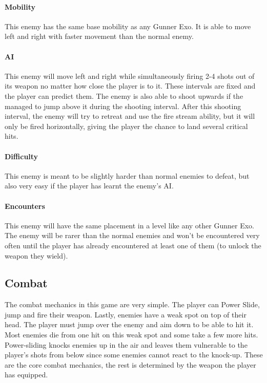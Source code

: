 \documentclass[12pt]{article}
\begin{document}
\paragraph{Mobility}

This enemy has the same base mobility as any Gunner Exo. It is able to move left and right with faster movement than the normal enemy.

\paragraph{AI}

This enemy will move left and right while simultaneously firing 2-4 shots out of its weapon no matter how close the player is to it. These intervals are fixed and the player can predict them. The enemy is also able to shoot upwards if the managed to jump above it during the shooting interval. After this shooting interval, the enemy will try to retreat and use the fire stream ability, but it will only be fired horizontally, giving the player the chance to land several critical hits. 

\paragraph{Difficulty}

This enemy is meant to be slightly harder than normal enemies to defeat, but also very easy if the player has learnt the enemy's AI. 

\paragraph{Encounters}

This enemy will have the same placement in a level like any other Gunner Exo. The enemy will be rarer than the normal enemies and won't be encountered very often until the player has already encountered at least one of them (to unlock the weapon they wield). 

\subsection{Combat}

The combat mechanics in this game are very simple. The player can Power Slide, jump and fire their weapon. Lastly, enemies have a weak spot on top of their head. The player must jump over the enemy and aim down to be able to hit it. Most enemies die from one hit on this weak spot and some take a few more hits. Power-sliding knocks enemies up in the air and leaves them vulnerable to the player's shots from below since some enemies cannot react to the knock-up.
These are the core combat mechanics, the rest is determined by the weapon the player has equipped.
\end{document}
